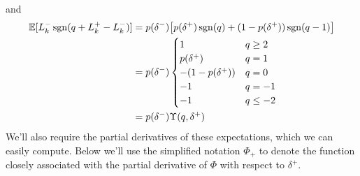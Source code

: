 and
\begin{align}
\mathbb{E} [ L_k^- \operatorname{\mathrm{sgn}}(q + L_k^+ - L_k^-)] & = p(\delta^-) \bigl[ p(\delta^+) \operatorname{\mathrm{sgn}}(q) + (1-p(\delta^+)) \operatorname{\mathrm{sgn}}(q-1) \bigr] \nonumber \\
& = p(\delta^-) \begin{cases} 
1 & q \geq 2 \\
p(\delta^+) & q = 1 \\
-(1 - p(\delta^+)) & q = 0 \\
-1 & q = -1 \\
-1 & q \leq -2
\end{cases} \\
& = p(\delta^-) \Upsilon(q, \delta^+)
\end{align}
We'll also require the partial derivatives of these expectations, which we can easily compute. Below we'll use the simplified notation $\Phi_+$ to denote the function closely associated with the partial derivative of $ \Phi$ with respect to $\delta^+$.
